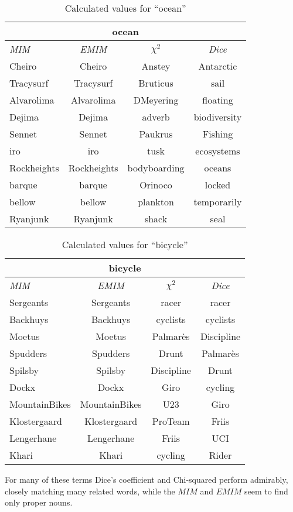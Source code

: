 \begin{table}[h!]
\centering
\begin{tabular}{ l | c | c | c }
\hline
\multicolumn{4}{c}{ocean}\\
\hline
\textit{MIM} & \textit{EMIM} & \textit{\(\chi^2\)} & \textit{Dice}\\
\hline
Cheiro & Cheiro & Anstey & Antarctic\\
Tracysurf & Tracysurf & Bruticus & sail\\
Alvarolima & Alvarolima & DMeyering & floating\\
Dejima & Dejima & adverb & biodiversity\\
Sennet & Sennet & Paukrus & Fishing\\
iro & iro & tusk & ecosystems\\
Rockheights & Rockheights & bodyboarding & oceans\\
barque & barque & Orinoco & locked\\
bellow & bellow & plankton & temporarily\\
Ryanjunk & Ryanjunk & shack & seal\\
\hline
\end{tabular}
\caption{Calculated values for ``ocean''}
\label{tab:words}
\end{table}
\begin{table}[h!]
\centering
\begin{tabular}{ l | c | c | c }
\hline
\multicolumn{4}{c}{bicycle}\\
\hline
\textit{MIM} & \textit{EMIM} & \textit{\(\chi^2\)} & \textit{Dice}\\
\hline
Sergeants & Sergeants & racer & racer\\
Backhuys & Backhuys & cyclists & cyclists\\
Moetus & Moetus & Palmarès & Discipline\\
Spudders & Spudders & Drunt & Palmarès\\
Spilsby & Spilsby & Discipline & Drunt\\
Dockx & Dockx & Giro & cycling\\
MountainBikes & MountainBikes & U23 & Giro\\
Klostergaard & Klostergaard & ProTeam & Friis\\
Lengerhane & Lengerhane & Friis & UCI\\
Khari & Khari & cycling & Rider\\
\hline
\end{tabular}
\caption{Calculated values for ``bicycle''}
\label{tab:words}
\end{table}

For many of these terms Dice's coefficient and Chi-squared perform admirably, closely matching many related words, while the \(MIM\) and \(EMIM\) seem to find only proper nouns.
